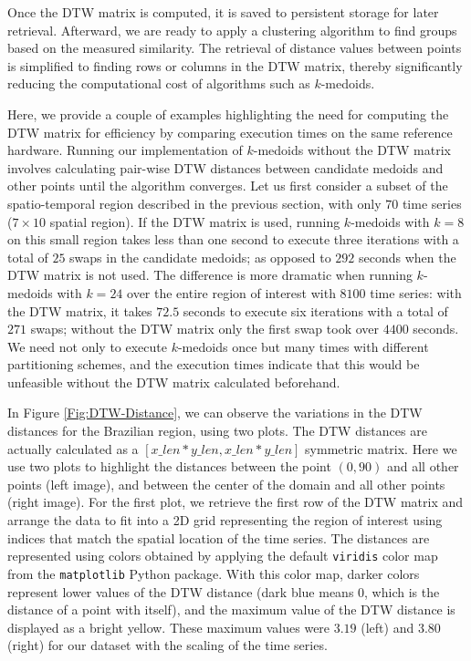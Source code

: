 Once the DTW matrix is computed, it is saved to persistent storage for later retrieval. Afterward, we are ready to apply a clustering algorithm to find groups based on the measured similarity. The retrieval of distance values between points is simplified to finding rows or columns in the DTW matrix, thereby significantly reducing the computational cost of algorithms such as $k$-medoids.

Here, we provide a couple of examples highlighting the need for computing the DTW matrix for efficiency by comparing execution times on the same reference hardware. Running our implementation of $k$-medoids without the DTW matrix involves calculating pair-wise DTW distances between candidate medoids and other points until the algorithm converges. Let us first consider a subset of the spatio-temporal region described in the previous section, with only $70$ time series ($7 \times 10$ spatial region). If the DTW matrix is used, running $k$-medoids with $k=8$ on this small region takes less than one second to execute three iterations with a total of $25$ swaps in the candidate medoids; as opposed to $292$ seconds when the DTW matrix is not used. The difference is more dramatic when running $k$-medoids with $k=24$ over the entire region of interest with $8100$ time series: with the DTW matrix, it takes $72.5$ seconds to execute six iterations with a total of $271$ swaps; without the DTW matrix only the first swap took over $4400$ seconds. We need not only to execute $k$-medoids once but many times with different partitioning schemes, and the execution times indicate that this would be unfeasible without the DTW matrix calculated beforehand.

In Figure \ref{Fig:DTW-Distance}, we can observe the variations in the DTW distances for the Brazilian region, using two plots. The DTW distances are actually calculated as a $[x\_len * y\_len, x\_len * y\_len]$ symmetric matrix. Here we use two plots to highlight the distances between the point $(0, 90)$ and all other points (left image), and between the center of the domain and all other points (right image). For the first plot, we retrieve the first row of the DTW matrix and arrange the data to fit into a 2D grid representing the region of interest using indices that match the spatial location of the time series. The distances are represented using colors obtained by applying the default \texttt{viridis} color map from the \texttt{matplotlib} Python package. With this color map, darker colors represent lower values of the DTW distance (dark blue means 0, which is the distance of a point with itself), and the maximum value of the DTW distance is displayed as a bright yellow. These maximum values were $3.19$ (left) and $3.80$ (right) for our dataset with the scaling of the time series.

